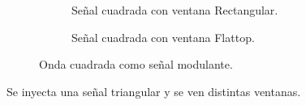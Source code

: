 \begin{figure}[H]
\begin{subfigure}[H]{0.48\textwidth}
          \caption{Señal cuadrada con ventana Rectangular.}
          \label{fig:Exp6SeñalFMModulanteCuadradaRectangular}
        \end{subfigure}
        \begin{subfigure}[H]{0.48\textwidth}
          \caption{Señal cuadrada con ventana Flattop.}
          \label{fig:Exp6SeñalFMModulanteCuadradaFlattop}
        \end{subfigure}
        \caption{Onda cuadrada como señal modulante.}
        \label{fig:Exp6SeñalFMModulanteCuadrada}
      \end{figure}   

      Se inyecta una señal triangular y se ven distintas ventanas.

